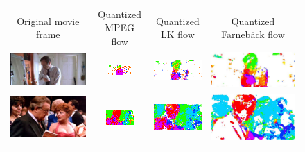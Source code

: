 \documentclass[10pt,twocolumn,letterpaper]{article}
\begin{document}
\begin{figure}[t!]
\begin{center}
\hspace*{-.2cm}
\begin{tabular}{cccc}
\small Original movie frame & \small Quantized MPEG flow & \small Quantized LK flow & \small Quantized Farneb\"ack flow \\
\includegraphics[width=.23\textwidth]{figures/flow/actioncliptrain00009_0010bright.jpg} &
\includegraphics[width=.23\textwidth]{figures/flow/flow_actioncliptrain00009_frame010_mpeg_quant.png} & 
\includegraphics[width=.23\textwidth]{figures/flow/flow_actioncliptrain00009_frame010_stip_quant.png} &
\includegraphics[width=.23\textwidth]{figures/flow/flow_actioncliptrain00009_frame010_traj_quant.jpeg}\\
\includegraphics[width=.23\textwidth]{figures/flow/flow_actioncliptest00686_frame010.jpeg} & 
\includegraphics[width=.23\textwidth]{figures/flow/flow_actioncliptest00686_frame010_mv_quant.png} & 
\includegraphics[width=.23\textwidth]{figures/flow/flow_actioncliptest00686_frame010_stip_quant.png} & 
\includegraphics[width=.23\textwidth]{figures/flow/flow_actioncliptest00686_frame010_traj_quant.jpeg} \\

\end{tabular}
\end{center}
\end{figure}
\end{document}

